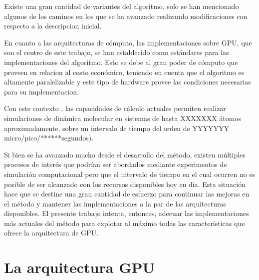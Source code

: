 \documentclass[a4paper,10pt]{report}
\begin{document}
Existe una gran cantidad de variantes del algoritmo, solo se han mencionado algunos de los caminos en los que se ha avanzado realizando modificaciones con respecto a la descripcion inicial.

En cuanto a las arquitecturas de cómputo, las implementaciones sobre GPU, que son el centro de este trabajo, se han establecido como estándares para las implementaciones del algoritmo. 
Esto se debe al gran poder de cómputo que proveen en relacion al costo económico, teniendo en cuenta que el algoritmo es altamente paralelizable y este tipo de hardware provee las condiciones necesarias para su implementacion.

Con este contexto , las capacidades de cálculo actuales permiten realizar simulaciones de dinámica molecular en sistemas de hasta XXXXXXX átomos aproximadamente, sobre un intervalo de tiempo del orden de YYYYYYY  micro/pico/******segundos).

Si bien se ha avanzado mucho desde el desarrollo del método, existen múltiples procesos de interés que podrían ser abordados mediante experimentos de simulación computacional pero que el intervalo de tiempo en el cual ocurren no es posible de ser alcanzado con los recursos disponibles hoy en dia.
Esta situación hace que se destine una gran cantidad de esfuerzo para continuar las mejoras en el método y mantener las implementaciones a la par de las arquitecturas disponibles.
El presente trabajo intenta, entonces, adecuar las implementaciones más actuales del método para explotar al máximo todas las características que ofrece la arquitectura de GPU. 
















\chapter{La arquitectura GPU}
\end{document}
